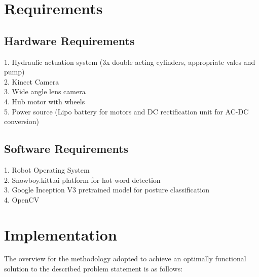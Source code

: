 \documentclass[12]{article}
\begin{document}
	
	\section{Requirements}
		\subsection{Hardware Requirements}
		1.	Hydraulic actuation system (3x double acting cylinders, appropriate vales and pump)\\
		2.	Kinect Camera \\
		3.	Wide angle lens camera\\ 
		4.	Hub motor with wheels\\
		5.	Power source (Lipo battery for motors and DC rectification unit for AC-DC conversion)\\
		
		\subsection{Software Requirements}
		1.	Robot Operating System \\
		2.	Snowboy.kitt.ai platform for hot word detection \\
		3.	Google Inception V3 pretrained model for posture classification \\
		4.	OpenCV 
		
	\section{Implementation}
	
		The overview for the methodology adopted to achieve an optimally functional solution to the described problem statement is as follows: \\
		
\end{document}
